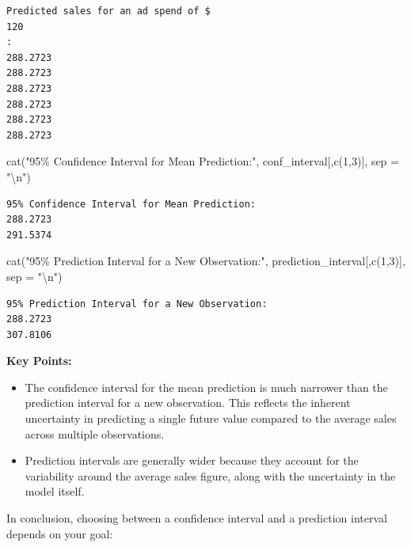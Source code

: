 \documentclass[
  letterpaper,
  paper =a4,
  twoside,
  openright,
  headsepline,
  footsepline,
  listof = totocnumbered,
  chapterprefix = true,
  firstiscover,
  parskip = full*]{scrbook}
\newenvironment{Shaded}{\begin{snugshade}}{\end{snugshade}}
\newcommand{\AttributeTok}[1]{\textcolor[rgb]{0.40,0.45,0.13}{#1}}
\newcommand{\DecValTok}[1]{\textcolor[rgb]{0.68,0.00,0.00}{#1}}
\newcommand{\FunctionTok}[1]{\textcolor[rgb]{0.28,0.35,0.67}{#1}}
\newcommand{\NormalTok}[1]{\textcolor[rgb]{0.00,0.23,0.31}{#1}}
\newcommand{\SpecialCharTok}[1]{\textcolor[rgb]{0.37,0.37,0.37}{#1}}
\newcommand{\StringTok}[1]{\textcolor[rgb]{0.13,0.47,0.30}{#1}}
\begin{document}
\begin{verbatim}
Predicted sales for an ad spend of $
120
:
288.2723
288.2723
288.2723
288.2723
288.2723
288.2723
\end{verbatim}

\begin{Shaded}
\begin{Highlighting}[]
\FunctionTok{cat}\NormalTok{(}\StringTok{"95\% Confidence Interval for Mean Prediction:"}\NormalTok{, conf\_interval[,}\FunctionTok{c}\NormalTok{(}\DecValTok{1}\NormalTok{,}\DecValTok{3}\NormalTok{)], }\AttributeTok{sep =} \StringTok{"}\SpecialCharTok{\textbackslash{}n}\StringTok{"}\NormalTok{) }
\end{Highlighting}
\end{Shaded}

\begin{verbatim}
95% Confidence Interval for Mean Prediction:
288.2723
291.5374
\end{verbatim}

\begin{Shaded}
\begin{Highlighting}[]
\FunctionTok{cat}\NormalTok{(}\StringTok{"95\% Prediction Interval for a New Observation:"}\NormalTok{, prediction\_interval[,}\FunctionTok{c}\NormalTok{(}\DecValTok{1}\NormalTok{,}\DecValTok{3}\NormalTok{)], }\AttributeTok{sep =} \StringTok{"}\SpecialCharTok{\textbackslash{}n}\StringTok{"}\NormalTok{)}
\end{Highlighting}
\end{Shaded}

\begin{verbatim}
95% Prediction Interval for a New Observation:
288.2723
307.8106
\end{verbatim}

\textbf{Key Points:}

\begin{itemize}
\item
  The confidence interval for the mean prediction is much narrower than
  the prediction interval for a new observation. This reflects the
  inherent uncertainty in predicting a single future value compared to
  the average sales across multiple observations.
\item
  Prediction intervals are generally wider because they account for the
  variability around the average sales figure, along with the
  uncertainty in the model itself.
\end{itemize}

In conclusion, choosing between a confidence interval and a prediction
interval depends on your goal:
\end{document}
